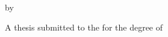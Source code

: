   \makeatletter
\begin{titlepage}
\begin{center}

  \large %

  {\Huge\textsc{\@title}\par}


  by


  {\huge\textsc{\@author}}



    A thesis submitted to the \@institution{} for the degree of\\
  \textsc{\@degree}

  \vfill

  \flushright
    \@institution \\
    \@date

\end{center}
\end{titlepage}
  \makeatother
